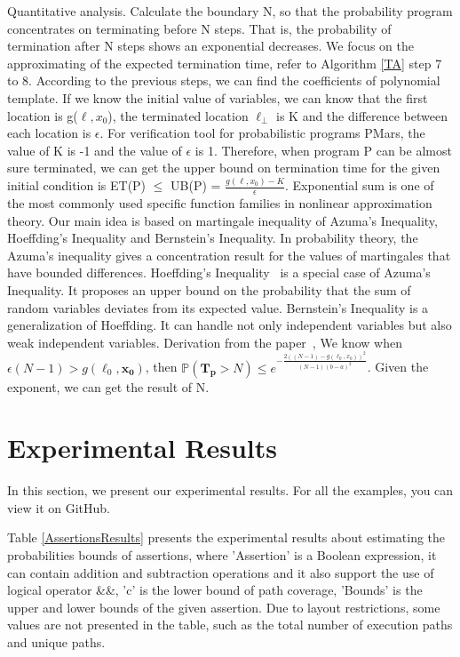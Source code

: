 Quantitative analysis. Calculate the boundary N, so that the probability program concentrates on terminating before N steps. That is, the probability of termination after N steps shows an exponential decreases. We focus on the approximating of the expected termination time, refer to Algorithm \ref{TA} step 7 to 8. According to the previous steps, we can find the coefficients of polynomial template. If we know the initial value of variables, we can know that the first location is g($\ell, x_0$), the terminated location $\ell_\bot$ is K and the difference between each location is $\epsilon$. For verification tool for probabilistic programs PMars, the value of K is -1 and the value of $\epsilon$ is 1. Therefore, when program P can be almost sure terminated, we can get the upper bound on termination time for the given initial condition is ET(P) $\leq$ UB(P) = $\frac{g(\ell, x_0)-K}{\epsilon}$.  Exponential sum is one of the most commonly used specific function families in nonlinear approximation theory. Our main idea is based on martingale inequality of Azuma's Inequality, Hoeffding's Inequality and Bernstein's Inequality. In probability theory, the Azuma's inequality gives a concentration result for the values of martingales that have bounded differences. Hoeffding's Inequality~\cite{Hoeffding1963} is a special case of Azuma's Inequality. It proposes an upper bound on the probability that the sum of random variables deviates from its expected value. Bernstein's Inequality is a generalization of Hoeffding. It can handle not only independent variables but also weak independent variables. Derivation from the paper~\cite{cha2015algorithmic}, We know when $\epsilon(N-1) > g(\ell_0,\boldsymbol{x_0})$, then $\mathbb{P}(\bm{T_p} > N)\leq e^{-\frac{2((N-1)-g(\ell_0,x_0))^2}{(N-1)(b-a)^2}}$. Given the exponent, we can get the result of N.


\section{Experimental Results}
In this section, we present our experimental results. For all the examples, you can view it on GitHub.


Table \ref{AssertionsResults} presents the experimental results about estimating the probabilities bounds of assertions, where 'Assertion' is a Boolean expression, it can contain addition and subtraction operations and it also support the use of logical operator \&\&, 'c' is the lower bound of path coverage, 'Bounds' is the upper and lower bounds of the given assertion. Due to layout restrictions, some values are not presented in the table, such as the total number of execution paths and unique paths.

